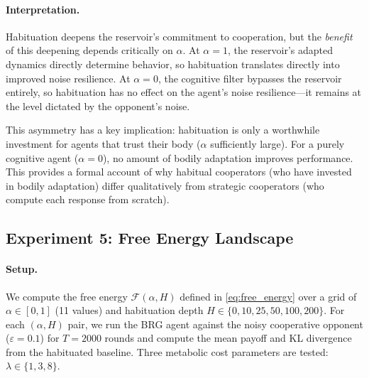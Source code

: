 \documentclass[11pt,a4paper]{article}
\theoremstyle{definition}
\newcommand{\FE}{\mathcal{F}}
\begin{document}
\paragraph{Interpretation.}
Habituation deepens the reservoir's commitment to cooperation, but the
\emph{benefit} of this deepening depends critically on $\alpha$.  At
$\alpha = 1$, the reservoir's adapted dynamics directly determine behavior,
so habituation translates directly into improved noise resilience.  At
$\alpha = 0$, the cognitive filter bypasses the reservoir entirely, so
habituation has no effect on the agent's noise resilience---it remains
at the level dictated by the opponent's noise.

This asymmetry has a key implication: habituation is only a worthwhile
investment for agents that trust their body ($\alpha$ sufficiently large).
For a purely cognitive agent ($\alpha = 0$), no amount of bodily adaptation
improves performance.  This provides a formal account of why habitual
cooperators (who have invested in bodily adaptation) differ qualitatively
from strategic cooperators (who compute each response from scratch).

\subsection{Experiment 5: Free Energy Landscape}
\label{sec:exp_free_energy}

\paragraph{Setup.}
We compute the free energy $\FE(\alpha, H)$ defined in
\eqref{eq:free_energy} over a grid of $\alpha \in [0,1]$ (11 values)
and habituation depth $H \in \{0, 10, 25, 50, 100, 200\}$.  For each
$(\alpha, H)$ pair, we run the BRG agent against the noisy cooperative
opponent ($\varepsilon = 0.1$) for $T = 2000$ rounds and compute the mean
payoff and KL divergence from the habituated baseline.  Three metabolic
cost parameters are tested: $\lambda \in \{1, 3, 8\}$.
\end{document}
